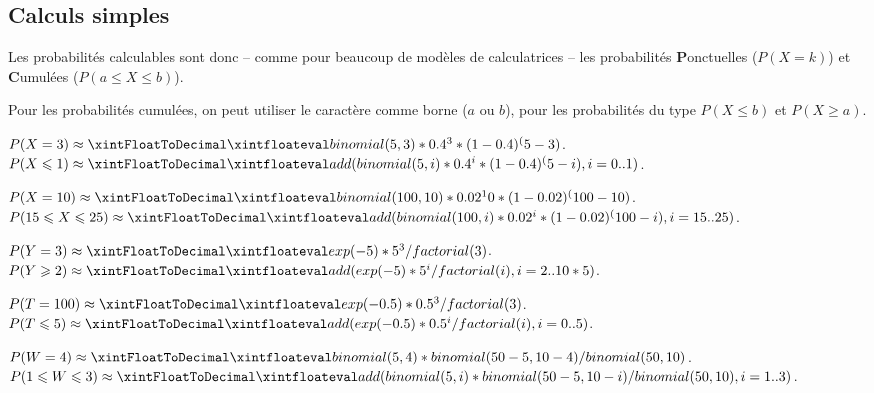 \documentclass[a4paper,french,11pt]{article}
\newcommand\ctex[1]{\tcbox[vignettelatex]{#1}}
\begin{document}
\subsection{Calculs \og simples \fg}

\begin{codetex}





\end{codetex}

\begin{codecles}
Les probabilités calculables sont donc -- comme pour beaucoup de modèles de calculatrices -- les probabilités \textbf{P}onctuelles ($P(X=k)$) et \textbf{C}umulées ($P(a\leqslant X\leqslant b)$).

\smallskip

Pour les probabilités cumulées, on peut utiliser le caractère \ctex{*} comme borne ($a$ ou $b$), pour les probabilités du type $P(X\leqslant b)$ et $P(X \geqslant a)$.
\end{codecles}

\begin{codetex}
$P(X=3) \approx \CalcBinomP{5}{0.4}{3}$.
$P(X\leqslant1) \approx \CalcBinomC{5}{0.4}{*}{1}$.

$P(X=10) \approx \CalcBinomP{100}{0.02}{10}$.
$P(15\leqslant X\leqslant25) \approx \CalcBinomC{100}{0.02}{15}{25}$.

$P(Y=3) \approx \CalcPoissP{5}{3}$.
$P(Y\geqslant2) \approx \CalcPoissC{5}{2}{*}$.

$P(T=100) \approx \CalcPoissP{0.5}{3}$.
$P(T\leqslant5) \approx \CalcPoissC{0.5}{*}{5}$.

$P(W=4) \approx \CalcHypergeomP{50}{10}{5}{4}$.
$P(1\leqslant W\leqslant3) \approx \CalcHypergeomC{50}{10}{5}{1}{3}$.
\end{codetex}
\end{document}
